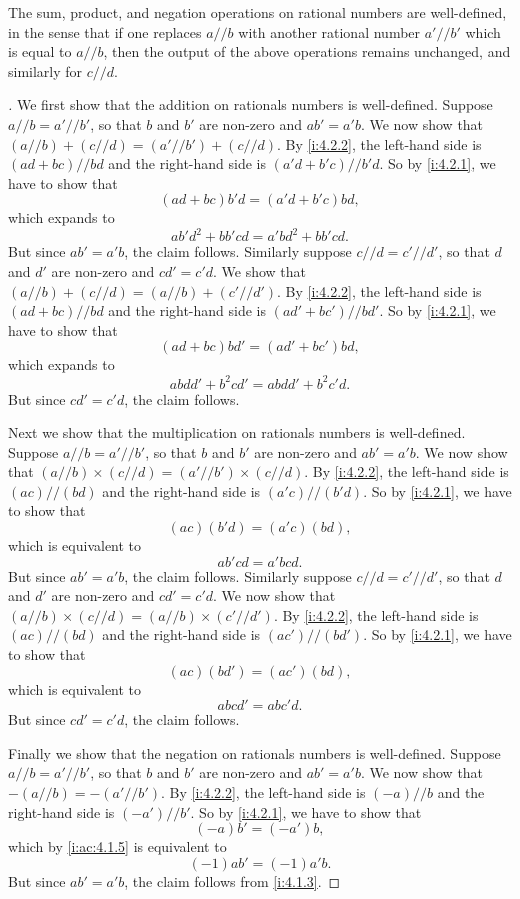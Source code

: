 \begin{lem}\label{i:4.2.3}
  The sum, product, and negation operations on rational numbers are well-defined, in the sense that if one replaces \(a // b\) with another rational number \(a' // b'\) which is equal to \(a // b\), then the output of the above operations remains unchanged, and similarly for \(c // d\).
\end{lem}

\begin{proof}[]
  We first show that the addition on rationals numbers is well-defined.
  Suppose \(a // b = a' // b'\), so that \(b\) and \(b'\) are non-zero and \(ab' = a'b\).
  We now show that \((a // b) + (c // d) = (a' // b') + (c // d)\).
  By \cref{i:4.2.2}, the left-hand side is \((ad + bc) // bd\) and the right-hand side is \((a'd + b'c) // b'd\).
  So by \cref{i:4.2.1}, we have to show that
  \[
    (ad + bc)b'd = (a'd + b'c)bd,
  \]
  which expands to
  \[
    ab'd^2 + bb'cd = a'bd^2 + bb'cd.
  \]
  But since \(ab' = a'b\), the claim follows.
  Similarly suppose \(c // d = c' // d'\), so that \(d\) and \(d'\) are non-zero and \(cd' = c'd\).
  We show that \((a // b) + (c // d) = (a // b) + (c' // d')\).
  By \cref{i:4.2.2}, the left-hand side is \((ad + bc) // bd\) and the right-hand side is \((ad' + bc') // bd'\).
  So by \cref{i:4.2.1}, we have to show that
  \[
    (ad + bc)bd' = (ad' + bc')bd,
  \]
  which expands to
  \[
    abdd' + b^2cd' = abdd' + b^2c'd.
  \]
  But since \(cd' = c'd\), the claim follows.

  Next we show that the multiplication on rationals numbers is well-defined.
  Suppose \(a // b = a' // b'\), so that \(b\) and \(b'\) are non-zero and \(ab' = a'b\).
  We now show that \((a // b) \times (c // d) = (a' // b') \times (c // d)\).
  By \cref{i:4.2.2}, the left-hand side is \((ac) // (bd)\) and the right-hand side is \((a'c) // (b'd)\).
  So by \cref{i:4.2.1}, we have to show that
  \[
    (ac)(b'd) = (a'c)(bd),
  \]
  which is equivalent to
  \[
    ab'cd = a'bcd.
  \]
  But since \(ab' = a'b\), the claim follows.
  Similarly suppose \(c // d = c' // d'\), so that \(d\) and \(d'\) are non-zero and \(cd' = c'd\).
  We now show that \((a // b) \times (c // d) = (a // b) \times (c' // d')\).
  By \cref{i:4.2.2}, the left-hand side is \((ac) // (bd)\) and the right-hand side is \((ac') // (bd')\).
  So by \cref{i:4.2.1}, we have to show that
  \[
    (ac)(bd') = (ac')(bd),
  \]
  which is equivalent to
  \[
    abcd' = abc'd.
  \]
  But since \(cd' = c'd\), the claim follows.

  Finally we show that the negation on rationals numbers is well-defined.
  Suppose \(a // b = a' // b'\), so that \(b\) and \(b'\) are non-zero and \(ab' = a'b\).
  We now show that \(-(a // b) = -(a' // b')\).
  By \cref{i:4.2.2}, the left-hand side is \((-a) // b\) and the right-hand side is \((-a') // b'\).
  So by \cref{i:4.2.1}, we have to show that
  \[
    (-a)b' = (-a')b,
  \]
  which by \cref{i:ac:4.1.5} is equivalent to
  \[
    (-1)ab' = (-1)a'b.
  \]
  But since \(ab' = a'b\), the claim follows from \cref{i:4.1.3}.
\end{proof}

